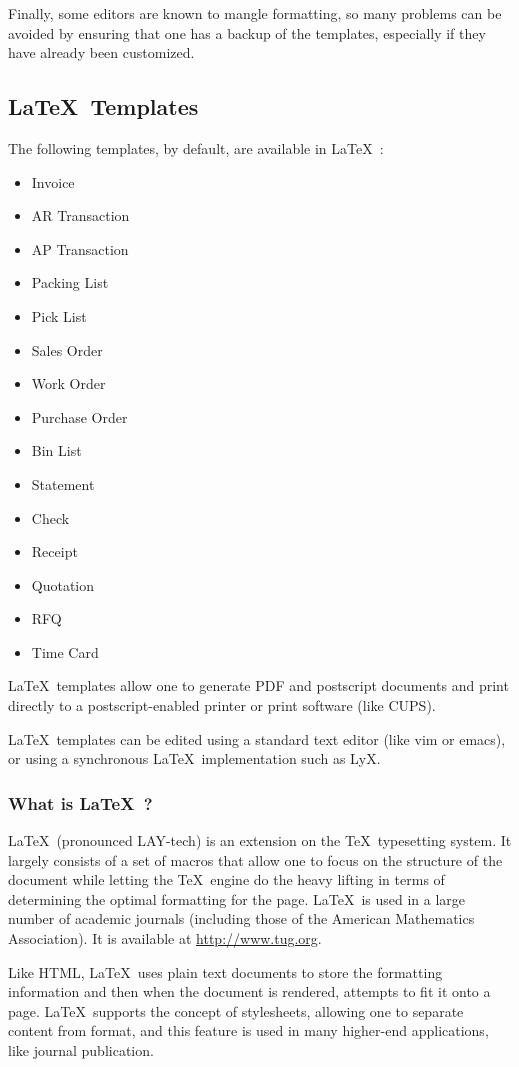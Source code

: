 \documentclass{article}
\begin{document}
Finally, some editors are known to mangle formatting, so many problems can be
avoided by ensuring that one has a backup of the templates, especially if they
have already been customized.

\subsection{\LaTeX\ Templates}
The following templates, by default, are available in \LaTeX\ :

\begin{itemize}
\item Invoice
\item AR Transaction
\item AP Transaction
\item Packing List
\item Pick List
\item Sales Order
\item Work Order
\item Purchase Order
\item Bin List
\item Statement
\item Check
\item Receipt
\item Quotation
\item RFQ
\item Time Card
\end{itemize}

\LaTeX\ templates allow one to generate PDF and postscript documents and print
directly to a postscript-enabled printer or print software (like CUPS).

\LaTeX\ templates can be edited using a standard text editor (like vim or emacs),
or using a synchronous \LaTeX\ implementation such as LyX.

\subsubsection{What is \LaTeX\ ?}
\LaTeX\ (pronounced LAY-tech) is an extension on the \TeX\ typesetting system.  It
largely consists of a set of macros that allow one to focus on the structure of
the document while letting the \TeX\ engine do the heavy lifting in terms of
determining the optimal formatting for the page.  \LaTeX\ is used in a large
number of academic journals (including those of the American Mathematics
Association).  It is available at \url{http://www.tug.org}.

Like HTML, \LaTeX\ uses plain text documents to store the formatting information
and then when the document is rendered, attempts to fit it onto a page.  \LaTeX\
supports the concept of stylesheets, allowing one to separate content from
format, and this feature is used in many higher-end applications, like journal
publication.
\end{document}
